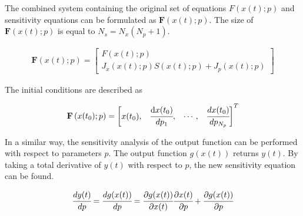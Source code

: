 \documentclass[../Article_Model_Parameters.tex]{subfiles}
\begin{document}
	The combined system containing the original set of equations ${F}({x}(t);{p})$ and sensitivity equations can be formulated as ${\textbf{F}}\left({x}(t);{p}\right)$. The size of ${\textbf{F}}\left({x}(t);{p}\right)$ is equal to $N_s = N_x(N_p + 1)$.
	
	{\footnotesize
		\begin{align}
			{\textbf{F}}\left({x}(t);{p}\right) = 
			\begin{bmatrix}
				{F}({x}(t);{p})\\
				{J_x}({x}(t);{p}){S}({x}(t);{p}) + {J_p}({x}(t);{p})
			\end{bmatrix}
	\end{align} }
	
	The initial conditions are described as
	
	{\footnotesize
		\begin{align}
			{\textbf{F}}\left({x}(t_0);{p}\right)  = 
			\begin{bmatrix} {x}(t_0),			& 
				\cfrac{ \text{d}{x}(t_0) }{ d{p_1} },		& 
				\cdots,					 	&
				\cfrac{ d{x}(t_0) }{ d{p_{N_p}} } 
			\end{bmatrix}^T
	\end{align} }
	
	In a similar way, the sensitivity analysis of the output function can be performed with respect to parameters ${p}$. The output function ${g}({x}(t))$ returns ${y}(t)$. By taking a total derivative of ${y}(t)$ with respect to ${p}$, the new sensitivity equation can be found.
	
	{\footnotesize
		\begin{align}
			\cfrac{d {y}(t)}{d{p}} = \cfrac{d {g}({x}(t))}{d{p}} = \cfrac{\partial {g}({x}(t))}{\partial {x}(t)} \cfrac{\partial {x}(t)}{\partial {p}} + \cfrac{\partial {g}({x}(t))}{\partial {p}}
	\end{align} }
	
\end{document}
